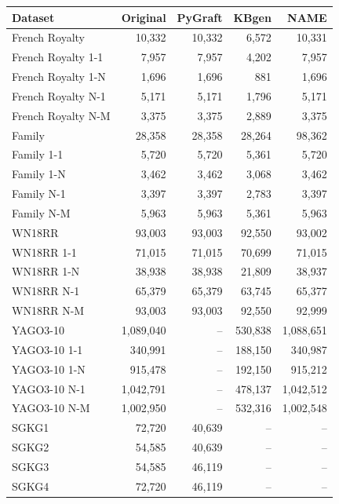 \begin{tabular}{lrrrr}
\toprule
Dataset & Original & PyGraft & KBgen & NAME \\
\midrule
French Royalty & 10{,}332 & 10{,}332 & 6{,}572 & 10{,}331 \\
French Royalty 1-1 & 7{,}957 & 7{,}957 & 4{,}202 & 7{,}957 \\
French Royalty 1-N & 1{,}696 & 1{,}696 & 881 & 1{,}696 \\
French Royalty N-1 & 5{,}171 & 5{,}171 & 1{,}796 & 5{,}171 \\
French Royalty N-M & 3{,}375 & 3{,}375 & 2{,}889 & 3{,}375 \\
\midrule
Family & 28{,}358 & 28{,}358 & 28{,}264 & 98{,}362 \\
Family 1-1 & 5{,}720 & 5{,}720 & 5{,}361 & 5{,}720 \\
Family 1-N & 3{,}462 & 3{,}462 & 3{,}068 & 3{,}462 \\
Family N-1 & 3{,}397 & 3{,}397 & 2{,}783 & 3{,}397 \\
Family N-M & 5{,}963 & 5{,}963 & 5{,}361 & 5{,}963 \\
\midrule
WN18RR & 93{,}003 & 93{,}003 & 92{,}550 & 93{,}002 \\
WN18RR 1-1 & 71{,}015 & 71{,}015 & 70{,}699 & 71{,}015 \\
WN18RR 1-N & 38{,}938 & 38{,}938 & 21{,}809 & 38{,}937 \\
WN18RR N-1 & 65{,}379 & 65{,}379 & 63{,}745 & 65{,}377 \\
WN18RR N-M & 93{,}003 & 93{,}003 & 92{,}550 & 92{,}999 \\
\midrule
YAGO3-10 & 1{,}089{,}040 & – & 530{,}838 & 1{,}088{,}651 \\
YAGO3-10 1-1 & 340{,}991 & – & 188{,}150 & 340{,}987 \\
YAGO3-10 1-N & 915{,}478 & – & 192{,}150 & 915{,}212 \\
YAGO3-10 N-1 & 1{,}042{,}791 & – & 478{,}137 & 1{,}042{,}512 \\
YAGO3-10 N-M & 1{,}002{,}950 & – & 532{,}316 & 1{,}002{,}548 \\
\midrule
SGKG1 & 72{,}720 & 40{,}639 & – & – \\
SGKG2 & 54{,}585 & 40{,}639 & – & – \\
SGKG3 & 54{,}585 & 46{,}119 & – & – \\
SGKG4 & 72{,}720 & 46{,}119 & – & – \\
\bottomrule
\end{tabular}
